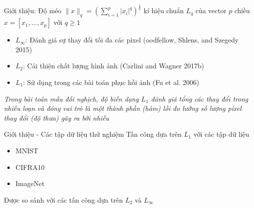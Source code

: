 \begin{frame}{Giới thiệu: Độ méo}
    $\lVert x \rVert_q = \left( \sum_{i=1}^p |x_i|^q \right)^{\frac{1}{q}}$ kí hiệu chuẩn $L_q$
    của vector $p$ chiều $x = [x_1, ..., x_p]$ với $q \geq 1$ 
    
    \begin{itemize}
        \item $L_{\infty}$: Đánh giá sự thay đổi tối đa các pixel (oodfellow, Shlens, and Szegedy 2015)
        \item $L_2$: Cải thiện chất lượng hình ảnh (Carlini and Wagner 2017b)
        \item $L_1$: Sử dụng trong các bài toán phục hồi ảnh (Fu et al. 2006)
    \end{itemize}

    \textit{Trong bài toán mẫu đối nghịch, độ biến dạng $L_1$ đánh giá tổng các thay đổi trong nhiễu loạn và đóng vai trò là một thành phần
    (hàm) lồi đo lường số lượng pixel thay đổi (độ thưa) gây ra bởi nhiễu}
\end{frame}

\begin{frame}{Giới thiệu - Các tập dữ liệu thử nghiệm}
    Tấn công dựa trên $L_1$ với các tập dữ liệu  
    \begin{itemize}
        \item MNIST
        \item CIFRA10
        \item ImageNet
    \end{itemize}
    Được so sánh với các tấn công dựa trên $L_2$ và $L_{\infty}$
\end{frame}